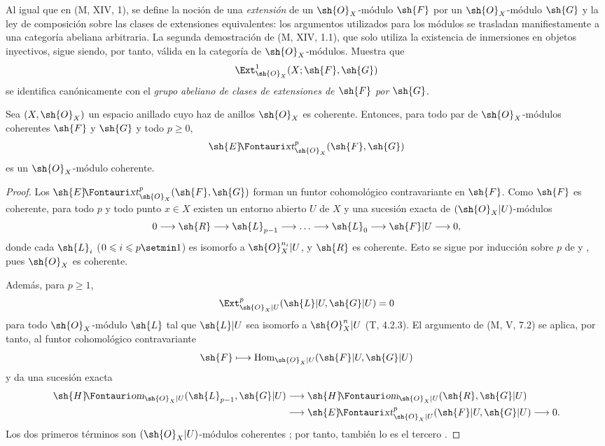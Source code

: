 \documentclass[oneside]{amsart}
\makeatletter
\renewcommand{\leq}{\leqslant}
\renewcommand{\geq}{\geqslant}
\newcommand*{\ega@sheafop}[3]{\sh{#1}#2\textup{\kern-2.2pt{\Fontauri\slshape #3}}}
\newcommand*{\shHom}{\ega@sheafop{H}{}{om}}
\newcommand*{\shExt}{\ega@sheafop{E}{}{xt}}
\let\EGAOriginalLabel\label
\renewcommand{\label}[1]{\phantomsection\EGAOriginalLabel{#1}}
\makeatother
\begin{document}
\begin{env}[12.3.2]
\label{0.12.3.2}
Al igual que en (M, XIV, 1), se define la noción de una
\emph{extensión} de un $\sh{O}_X$-módulo $\sh{F}$ por un
$\sh{O}_X$-módulo $\sh{G}$ y la ley de composición sobre las clases de
extensiones equivalentes: los argumentos utilizados para los módulos se
trasladan manifiestamente a una categoría abeliana arbitraria.
La segunda demostración de (M, XIV, 1.1), que solo utiliza la existencia de
inmersiones en objetos inyectivos, sigue siendo, por tanto, válida en la
categoría de $\sh{O}_X$-módulos.  Muestra que
\[
  \Ext^1_{\sh{O}_X}(X;\sh{F},\sh{G})
\]
se identifica canónicamente con el \emph{grupo abeliano de clases de
extensiones de $\sh{F}$ por $\sh{G}$}.
\end{env}

\begin{proposition}[12.3.3]
\label{0.12.3.3}
Sea $(X,\sh{O}_X)$ un espacio anillado cuyo haz de anillos
$\sh{O}_X$ es coherente.
Entonces, para todo par de $\sh{O}_X$-módulos coherentes $\sh{F}$ y
$\sh{G}$ y todo $p\geq0$,
\[
  \shExt^p_{\sh{O}_X}(\sh{F},\sh{G})
\]
es un $\sh{O}_X$-módulo coherente.
\end{proposition}

\begin{proof}
Los $\shExt^p_{\sh{O}_X}(\sh{F},\sh{G})$ forman un funtor cohomológico
contravariante en $\sh{F}$.
Como $\sh{F}$ es coherente, para todo $p$ y todo punto $x\in X$
existen un entorno abierto $U$ de $X$ y una sucesión exacta
de $(\sh{O}_X|U)$-módulos
\[
  0\longrightarrow\sh{R}\longrightarrow\sh{L}_{p-1}
  \longrightarrow\ldots\longrightarrow\sh{L}_0
  \longrightarrow\sh{F}|U\longrightarrow0,
\]
donde cada $\sh{L}_i$ ($0\leq i\leq p\setmin 1$) es isomorfo a
$\sh{O}_X^{n_i}|U$, y $\sh{R}$ es coherente.
Esto se sigue por inducción sobre $p$ de
 y
, pues $\sh{O}_X$ es coherente.

Además, para $p\geq1$,
\[
  \Ext^p_{\sh{O}_X|U}(\sh{L}|U,\sh{G}|U)=0
\]
para todo $\sh{O}_X$-módulo $\sh{L}$ tal que $\sh{L}|U$ sea
isomorfo a $\sh{O}_X^n|U$ (T, 4.2.3).
El argumento de (M, V, 7.2) se aplica, por tanto, al funtor cohomológico
contravariante
\[
  \sh{F}\longmapsto
  \mathrm{Hom}_{\sh{O}_X|U}(\sh{F}|U,\sh{G}|U)
\]
y da una sucesión exacta
\[
  \begin{aligned}
  \shHom_{\sh{O}_X|U}(\sh{L}_{p-1},\sh{G}|U)
  &\longrightarrow
  \shHom_{\sh{O}_X|U}(\sh{R},\sh{G}|U)\\
  &\longrightarrow
  \shExt^p_{\sh{O}_X|U}(\sh{F}|U,\sh{G}|U)
  \longrightarrow0.
  \end{aligned}
\]
Los dos primeros términos son $(\sh{O}_X|U)$-módulos coherentes
; por tanto, también lo es el tercero
.
\end{proof}
\end{document}
